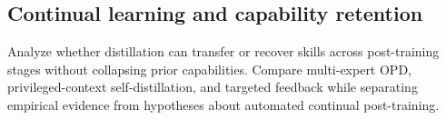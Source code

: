 \subsection{Continual learning and capability retention}
Analyze whether distillation can transfer or recover skills across post-training stages
without collapsing prior capabilities. Compare multi-expert OPD, privileged-context
self-distillation, and targeted feedback while separating empirical evidence from hypotheses
about automated continual post-training.
